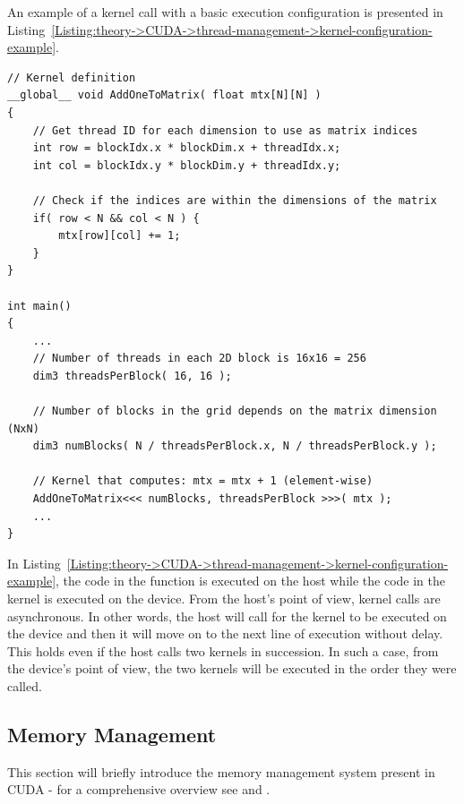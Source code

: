 An example of a kernel call with a basic execution configuration is presented in Listing~\ref{Listing:theory->CUDA->thread-management->kernel-configuration-example}.

\begin{lstlisting}[caption={Excerpt of C++ code portraying the creation of a grid configuration and the launching of a kernel.
The example implementation aims to increment every value of the \code{N}-by-\code{N} matrix \code{mtx} by 1 using the device. \code{dim3} is an integer vector type based on \code{uint3} that is used to specify dimensions - unspecified components are implicitly set to 1 \cite{NVIDIADecember2022}.
Taken from \citetitle{NVIDIADecember2022} \cite{NVIDIADecember2022}.},label={Listing:theory->CUDA->thread-management->kernel-configuration-example}]
// Kernel definition
__global__ void AddOneToMatrix( float mtx[N][N] )
{
	// Get thread ID for each dimension to use as matrix indices
	int row = blockIdx.x * blockDim.x + threadIdx.x;
	int col = blockIdx.y * blockDim.y + threadIdx.y;
	
	// Check if the indices are within the dimensions of the matrix
	if( row < N && col < N ) {
		mtx[row][col] += 1;
	}
}

int main()
{
	...
	// Number of threads in each 2D block is 16x16 = 256
	dim3 threadsPerBlock( 16, 16 );
	
	// Number of blocks in the grid depends on the matrix dimension (NxN)
	dim3 numBlocks( N / threadsPerBlock.x, N / threadsPerBlock.y );
	
	// Kernel that computes: mtx = mtx + 1 (element-wise)
	AddOneToMatrix<<< numBlocks, threadsPerBlock >>>( mtx );
	...
}
\end{lstlisting}

In Listing~\ref{Listing:theory->CUDA->thread-management->kernel-configuration-example}, the code in the  function is executed on the host while the code in the  kernel is executed on the device.
From the host's point of view, kernel calls are asynchronous.
In other words, the host will call for the kernel to be executed on the device and then it will move on to the next line of execution without delay.
This holds even if the host calls two kernels in succession.
In such a case, from the device's point of view, the two kernels will be executed in the order they were called.

\subsection{Memory Management}\label{Subsection:theory->CUDA->memory-management}
This section will briefly introduce the memory management system present in CUDA - for a comprehensive overview see  \cite{Cejka2020} and  \cite{Cejka2022}.

